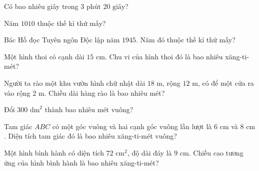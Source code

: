 \begin{ex}
  Có bao nhiêu giây trong $3\text{ phút } 20\text{ giây}$?
\end{ex}

\begin{ex}
  Năm $1010$ thuộc thế kỉ thứ mấy?
\end{ex}

\begin{ex}
  Bác Hồ đọc Tuyên ngôn Độc lập năm $1945$. Năm đó thuộc thế kỉ thứ mấy?
\end{ex}

\begin{ex}
  Một hình thoi có cạnh dài $15\text{ cm}$. Chu vi của hình thoi đó là bao nhiêu xăng-ti-mét?
\end{ex}

\begin{ex}
  Người ta rào một khu vườn hình chữ nhật dài $18\text{ m}$, rộng $12\text{ m}$, có để một cửa ra vào rộng $2\text{ m}$. Chiều dài hàng rào là bao nhiêu mét?
\end{ex}

\begin{ex}
  Đổi $300\text{ dm}^2$ thành bao nhiêu mét vuông?
\end{ex}

\begin{ex}
  Tam giác $ABC$ có một góc vuông và hai cạnh góc vuông lần lượt là $6\text{ cm}$ và $8\text{ cm}$. Diện tích tam giác đó là bao nhiêu xăng-ti-mét vuông?
\end{ex}

\begin{ex}
  Một hình bình hành có diện tích $72\text{ cm}^2$, độ dài đáy là $9\text{ cm}$. Chiều cao tương ứng của hình bình hành là bao nhiêu xăng-ti-mét?
\end{ex}

